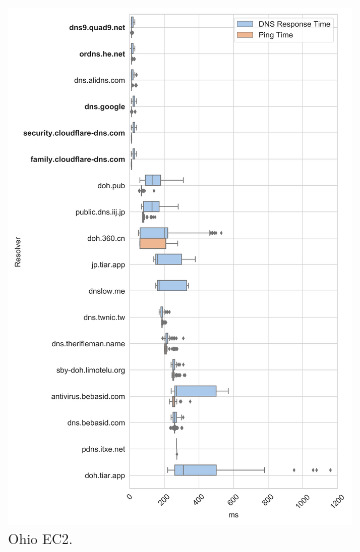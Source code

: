 \begin{figure}[t!]
\begin{subfigure}[b]{0.4\textwidth}
\includegraphics[width=\textwidth]{figures/ohio_asia.png}
\caption{Ohio EC2.}
\label{fig:subfigb}
\end{subfigure}
%
\hfill \\
\begin{subfigure}[b]{0.4\textwidth}

\end{subfigure}
\end{figure}
